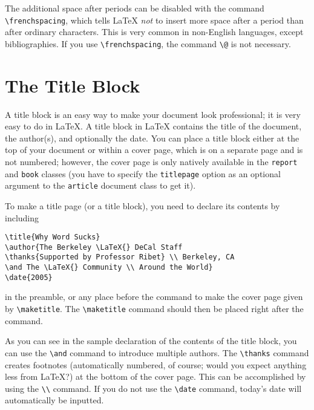 The additional space after periods can be disabled with the command
\verb=\frenchspacing=, which tells \LaTeX{} \emph{not} to insert more
space after a period than after ordinary characters.  This is very
common in non-English languages, except bibliographies.  If you use
\verb=\frenchspacing=, the command \verb=\@= is not necessary.

\section{The Title Block}
\label{sec:cover-page}

A title block is an easy way to make your document look professional;
it is very easy to do in \LaTeX{}.  A title block in \LaTeX{} contains
the title of the document, the author(s), and optionally the date. You
can place a title block either at the top of your document or within a
cover page, which is on a separate page and is not numbered; however,
the cover page is only natively available in the \texttt{report} and
\texttt{book} classes (you have to specify the \texttt{titlepage}
option as an optional argument to the \texttt{article} document class
to get it).

To make a title page (or a title block), you need to declare its
contents by including
\begin{verbatim}
\title{Why Word Sucks}
\author{The Berkeley \LaTeX{} DeCal Staff
\thanks{Supported by Professor Ribet} \\ Berkeley, CA
\and The \LaTeX{} Community \\ Around the World}
\date{2005}
\end{verbatim}
in the preamble, or any place before the command to make the cover
page given by \verb=\maketitle=.  The \verb=\maketitle= command should
then be placed right after the \verb== command.

As you can see in the sample declaration of the contents of the
title block, you can use the \verb=\and= command to introduce
multiple authors.  The \verb=\thanks= command creates footnotes
(automatically numbered, of course; would you expect anything less
from \LaTeX{}?) at the bottom of the cover page.  This can be
accomplished by using the \verb=\\= command.  If you do not use the
\verb=\date= command, today's date will automatically be inputted.

